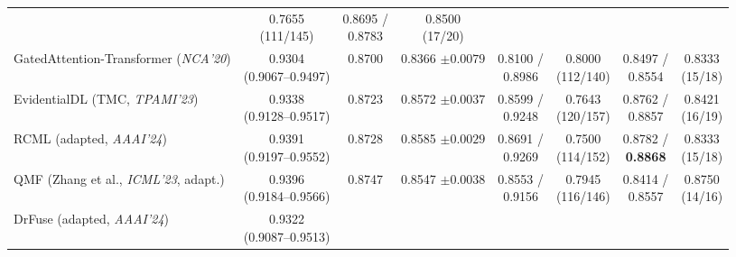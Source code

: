 \documentclass[10pt,twocolumn]{article}
\begin{document}
\begin{table}[t]
{\begin{tabular}{@{}>{\raggedright\arraybackslash}p{2.95cm}ccccccc@{}}
\shortstack{0.8357 /\\0.9096} & \shortstack{0.7655\\(111/145)} & \shortstack{0.8695 /\\0.8783}
& \shortstack{0.8500\\(17/20)} \\
GatedAttention-Transformer (\textit{NCA'20}) \cite{vaswani2017attention,arevalo2017gated} &
\shortstack{0.9304\\(0.9067--0.9497)} & 0.8700 & \shortstack{0.8366\\$\pm 0.0079$} &
\shortstack{0.8100 /\\0.8986} & \shortstack{0.8000\\(112/140)} & \shortstack{0.8497
/\\0.8554} & \shortstack{0.8333\\(15/18)} \\
EvidentialDL (TMC, \textit{TPAMI'23}) \cite{han2022trusted} &
\shortstack{0.9338\\(0.9128--0.9517)} & 0.8723 & \shortstack{0.8572\\$\pm 0.0037$} &
\shortstack{0.8599 /\\0.9248} & \shortstack{0.7643\\(120/157)} & \shortstack{0.8762 /\\0.8857}
& \shortstack{0.8421\\(16/19)} \\
RCML (adapted, \textit{AAAI'24}) \cite{xu2024reliable} & \shortstack{0.9391\\(0.9197--0.9552)}
& 0.8728 & \shortstack{0.8585\\$\pm 0.0029$} & \shortstack{0.8691 /\\0.9269} &
\shortstack{0.7500\\(114/152)} & \shortstack{0.8782 /\\\textbf{0.8868}} &
\shortstack{0.8333\\(15/18)} \\
QMF (Zhang et al., \textit{ICML'23}, adapt.) \cite{zhang2023provable} &
\shortstack{0.9396\\(0.9184--0.9566)} & 0.8747 & \shortstack{0.8547\\$\pm 0.0038$} &
\shortstack{0.8553 /\\0.9156} & \shortstack{0.7945\\(116/146)} & \shortstack{0.8414 /\\0.8557}
& \shortstack{0.8750\\(14/16)} \\
DrFuse (adapted, \textit{AAAI'24}) \cite{yao2024drfuse} & \shortstack{0.9322\\(0.9087--0.9513)}

\end{tabular}}
\end{table}
\end{document}
